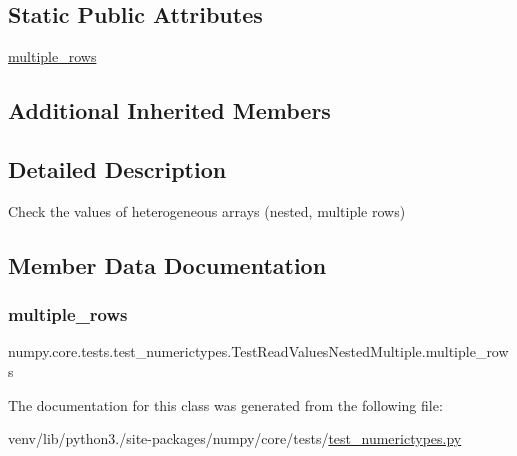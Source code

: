 \subsection*{Static Public Attributes}
\begin{DoxyCompactItemize}
\item 
\hyperlink{classnumpy_1_1core_1_1tests_1_1test__numerictypes_1_1TestReadValuesNestedMultiple_a72126a25526525eaa35b684d9d5118f8}{multiple\+\_\+rows}
\end{DoxyCompactItemize}
\subsection*{Additional Inherited Members}


\subsection{Detailed Description}
\begin{DoxyVerb}Check the values of heterogeneous arrays (nested, multiple rows)\end{DoxyVerb}
 

\subsection{Member Data Documentation}
\mbox{\label{classnumpy_1_1core_1_1tests_1_1test__numerictypes_1_1TestReadValuesNestedMultiple_a72126a25526525eaa35b684d9d5118f8}} 
\subsubsection{\texorpdfstring{multiple\+\_\+rows}{multiple\_rows}}
{\footnotesize\ttfamily numpy.\+core.\+tests.\+test\+\_\+numerictypes.\+Test\+Read\+Values\+Nested\+Multiple.\+multiple\+\_\+rows\hspace{0.3cm}{\ttfamily [static]}}



The documentation for this class was generated from the following file\+:\begin{DoxyCompactItemize}
\item 
venv/lib/python3./site-\/packages/numpy/core/tests/\hyperlink{test__numerictypes_8py}{test\+\_\+numerictypes.\+py}\end{DoxyCompactItemize}
